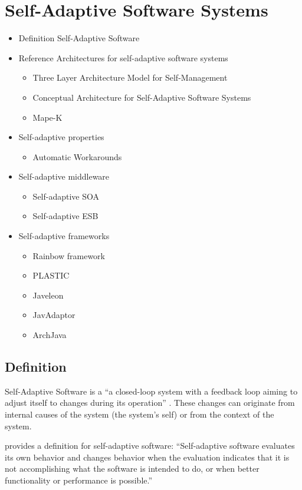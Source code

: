 \section{Self-Adaptive Software Systems}

\begin{itemize}
	\item Definition Self-Adaptive Software
	\item Reference Architectures for self-adaptive software systems
	\begin{itemize}
		\item Three Layer Architecture Model for Self-Management \citep{Kramer:2007ff}
		\item Conceptual Architecture for Self-Adaptive Software Systems \citep{Andersson:2009bq}
		\item Mape-K \citep{Group:2005ug}
	\end{itemize}
	\item Self-adaptive properties
	\begin{itemize}
		\item Automatic Workarounds
	\end{itemize}
	\item Self-adaptive middleware
	\begin{itemize}
		\item Self-adaptive \ac{SOA}
		\item Self-adaptive \ac{ESB}
	\end{itemize}
	\item Self-adaptive frameworks
	\begin{itemize}
		\item Rainbow framework
		\item PLASTIC
		\item Javeleon
		\item JavAdaptor
		\item ArchJava
	\end{itemize}
\end{itemize}

\subsection{Definition}
Self-Adaptive Software is a ``a closed-loop system with a feedback loop aiming to adjust itself to changes during its operation'' \citep{Salehie:2009pi}. These changes can originate from internal causes of the system (the system's self) or from the context of the system.

\citet{Laddaga:2008ff} provides a definition for self-adaptive software: ``Self-adaptive software evaluates its own behavior and changes behavior when the evaluation indicates that it is not accomplishing what the software is intended to do, or when better functionality or performance is possible.'' 

